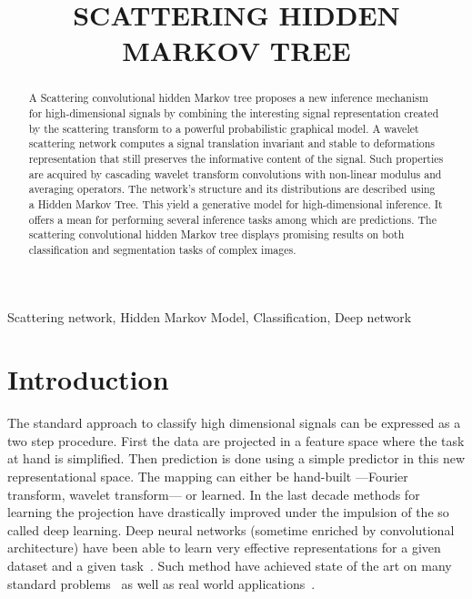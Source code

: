 \documentclass{article}
\title{SCATTERING HIDDEN MARKOV TREE}
\begin{document}
%
\maketitle
%
\begin{abstract}
  A Scattering convolutional hidden Markov tree proposes a new inference mechanism for high-dimensional signals by combining the interesting signal representation created by the scattering transform to a powerful probabilistic graphical model.
  A wavelet scattering network computes a signal translation invariant and stable to deformations representation that still preserves the informative content of the signal. Such properties are acquired by cascading wavelet transform convolutions with non-linear modulus and averaging operators.
  The network's structure and its distributions are described using a Hidden Markov Tree. This yield a generative model for high-dimensional inference. It offers a mean for performing several inference tasks among which are predictions. The scattering convolutional hidden Markov tree displays promising results on both classification and segmentation tasks of complex images.
\end{abstract}
%
\begin{keywords}
  Scattering network, Hidden Markov Model, Classification, Deep network
\end{keywords}
%
\section{Introduction}
\label{sec:Intro}

  The standard approach to classify high dimensional signals can be expressed as a two step procedure. First the data are projected in a feature space where the task at hand is simplified. Then prediction is done using a simple predictor in this new representational space. The mapping can either be hand-built ---\eg Fourier transform, wavelet transform--- or learned. In the last decade methods for learning the projection have drastically improved under the impulsion of the so called deep learning. Deep neural networks (sometime enriched by convolutional architecture) have been able to learn very effective representations for a given dataset and a given task~\citep{DNN, CNN}. Such method have achieved state of the art on many standard problems~\citep{alexNet} as well as real world applications~\citep{microsoft cortana}. 
  
  
\end{document}
